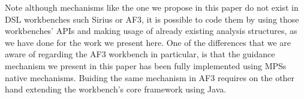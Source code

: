 Note although mechanisms like the one we propose in this paper do not exist in
DSL workbenches such Sirius or AF3, it is possible to code them by using those
workbenches' APIs and making usage of already existing analysis structures, as
we have done for the work we present here. One of the differences that we are
aware of regarding the AF3 workbench in particular, is that the guidance
mechanism we present in this paper has been fully implemented using MPSs native
mechanisms. Buiding the same mechanism in AF3 requires on the other hand
extending the workbench's core framework using Java.
 \vspace{-.6cm}


